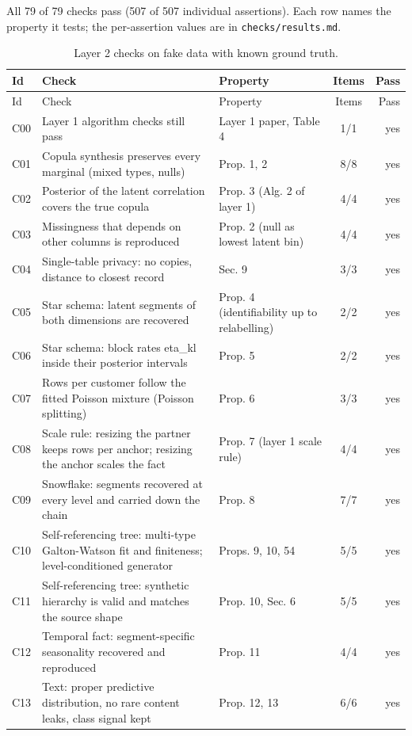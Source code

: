 All 79 of 79 checks pass (507 of 507 individual assertions). Each row names the property it tests; the per-assertion values are in \texttt{checks/results.md}.

\begin{longtable}{@{}l p{8.2cm} p{3.6cm} c r@{}}
\caption{Layer 2 checks on fake data with known ground truth.}\label{tab:results}\\
\toprule
Id & Check & Property & Items & Pass \\ \midrule \endfirsthead
\toprule Id & Check & Property & Items & Pass \\ \midrule \endhead
C00 & Layer 1 algorithm checks still pass & Layer 1 paper, Table 4 & 1/1 & yes \\
C01 & Copula synthesis preserves every marginal (mixed types, nulls) & Prop. 1, 2 & 8/8 & yes \\
C02 & Posterior of the latent correlation covers the true copula & Prop. 3 (Alg. 2 of layer 1) & 4/4 & yes \\
C03 & Missingness that depends on other columns is reproduced & Prop. 2 (null as lowest latent bin) & 4/4 & yes \\
C04 & Single-table privacy: no copies, distance to closest record & Sec. 9 & 3/3 & yes \\
C05 & Star schema: latent segments of both dimensions are recovered & Prop. 4 (identifiability up to relabelling) & 2/2 & yes \\
C06 & Star schema: block rates eta\_kl inside their posterior intervals & Prop. 5 & 2/2 & yes \\
C07 & Rows per customer follow the fitted Poisson mixture (Poisson splitting) & Prop. 6 & 3/3 & yes \\
C08 & Scale rule: resizing the partner keeps rows per anchor; resizing the anchor scales the fact & Prop. 7 (layer 1 scale rule) & 4/4 & yes \\
C09 & Snowflake: segments recovered at every level and carried down the chain & Prop. 8 & 7/7 & yes \\
C10 & Self-referencing tree: multi-type Galton-Watson fit and finiteness; level-conditioned generator & Props. 9, 10, 54 & 5/5 & yes \\
C11 & Self-referencing tree: synthetic hierarchy is valid and matches the source shape & Prop. 10, Sec. 6 & 5/5 & yes \\
C12 & Temporal fact: segment-specific seasonality recovered and reproduced & Prop. 11 & 4/4 & yes \\
C13 & Text: proper predictive distribution, no rare content leaks, class signal kept & Prop. 12, 13 & 6/6 & yes \\

\end{longtable}
